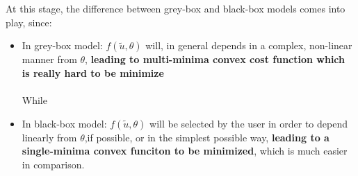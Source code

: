 \begin{enumerate}
At this stage, the difference between grey-box and black-box models comes into play, since:
\begin{itemize}
    \item In grey-box model: $f(\tilde{u},\theta)$ will, in general depends in a complex, non-linear manner from $\theta$, \textbf{leading to multi-minima convex cost function which is really hard to be minimize}\\ \\
    While\\
    \item In black-box model: $f(\tilde{u},\theta)$ will be selected by the user in order to depend linearly from $\theta$,if possible, or in the simplest possible way, \textbf{leading to a single-minima convex funciton to be minimized}, which is much easier in comparison.
\end{itemize}
\end{enumerate}

